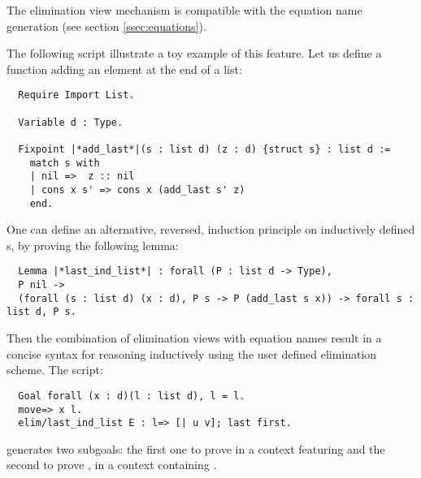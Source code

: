 The elimination view mechanism is compatible with the equation name
generation (see section \ref{ssec:equations}).

The following script illustrate a toy example of this feature. Let us
define a function adding an element at the end of a list:
\begin{lstlisting}
  Require Import List.

  Variable d : Type.

  Fixpoint |*add_last*|(s : list d) (z : d) {struct s} : list d :=
    match s with
    | nil =>  z :: nil
    | cons x s' => cons x (add_last s' z)
    end.
\end{lstlisting}

One can define an alternative, reversed, induction principle on inductively
defined s, by proving the following lemma:

\begin{lstlisting}
  Lemma |*last_ind_list*| : forall (P : list d -> Type),
  P nil ->
  (forall (s : list d) (x : d), P s -> P (add_last s x)) -> forall s : list d, P s.
\end{lstlisting}

Then the combination of elimination views with equation names result
in a concise syntax for reasoning inductively using the user
defined elimination scheme. The script:
\begin{lstlisting}
  Goal forall (x : d)(l : list d), l = l.
  move=> x l.
  elim/last_ind_list E : l=> [| u v]; last first.
\end{lstlisting}
generates two subgoals: the first one to prove  in a
context featuring  and the second to prove
, in a context containing
.

